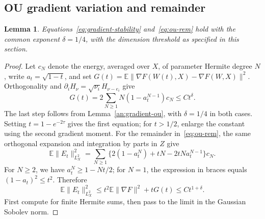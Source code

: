 \documentclass[a4paper]{tufte-handout}
\newtheorem{lemma}{Lemma}
\newcommand{\E}{\mathbb E}
\begin{document}
\begin{fullwidth}
\subsection{OU gradient variation and remainder}
\begin{lemma}\label{an:ou}
Equations~\eqref{eq:gradient-stability} and~\eqref{eq:ou-rem} hold with the common exponent $\delta=1/4$, with the dimension threshold as specified in this section.
\end{lemma}
\begin{proof}
Let $c_N$ denote the energy, averaged over $X$, of parameter Hermite degree $N$, write $a_t=\sqrt{1-t}$,
and set $G(t)=\E\|\nabla F(W(t),X)-\nabla F(W,X)\|^2$.
Orthogonality and $\partial_iH_\nu=\sqrt{\nu_i}H_{\nu-e_i}$ give
\[
 G(t)=2\sum_{N\ge1}N(1-a_t^{N-1})c_N\le Ct^\delta.
\]
The last step follows from Lemma~\ref{an:gradient-ou}, with $\delta=1/4$ in both cases.
Setting $t=1-e^{-2\tau}$ gives the first equation;
for $t>1/2$, enlarge the constant using the second gradient moment.
For the remainder in~\eqref{eq:ou-rem}, the same orthogonal expansion and integration by parts in $Z$ give
\[
 \E\|E_t\|_{L_X^2}^2=\sum_{N\ge1}\{2(1-a_t^N)+tN-2tNa_t^{N-1}\}c_N.
\]
For $N\ge2$, we have $a_t^N\ge1-Nt/2$; for $N=1$, the expression in braces equals
$(1-a_t)^2\le t^2$. Therefore
\begin{equation}\label{an:hermite}
 \E\|E_t\|_{L_X^2}^2\le t^2\E\|\nabla F\|^2+tG(t)\le Ct^{1+\delta}.
\end{equation}
First compute for finite Hermite sums, then pass to the limit in the Gaussian Sobolev norm.
\end{proof}


\end{fullwidth}
\end{document}
